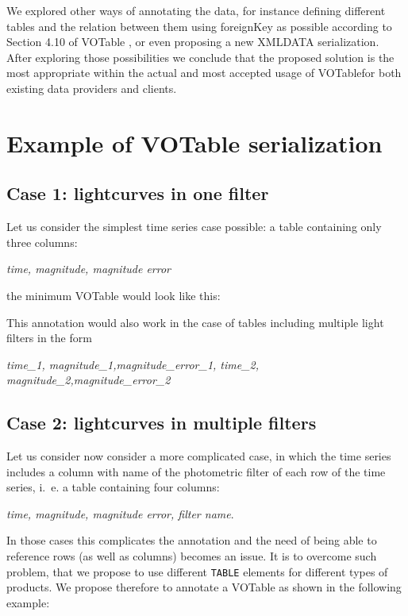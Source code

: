 \documentclass[11pt,a4paper]{ivoa}
\let\fg=\color
\def\elem#1{{\tt{\fg{DarkRed}#1}}}
\begin{document}


We explored other ways of annotating the data, for instance defining different tables and the relation between them using foreignKey as possible according to Section 4.10 of VOTable \citep{std:VOTABLE1.4}, or even proposing a new XMLDATA serialization. After exploring those possibilities we conclude that the proposed solution is the most appropriate within the actual and most accepted usage of VOTablefor both existing data providers and clients.

\section{Example of VOTable serialization}
\subsection{Case 1: lightcurves in one filter}
Let us consider the simplest time series case possible: a table containing only three columns:
\begin{center}
   \emph{time, magnitude, magnitude error}
\end{center}
the minimum VOTable would look like this:


This annotation would also work in the case of tables including multiple light filters in the form
\begin{center}
   \emph{time\_1, magnitude\_1,magnitude\_error\_1, time\_2, magnitude\_2,magnitude\_error\_2}
\end{center}

\subsection{Case 2: lightcurves in multiple filters}
Let us consider now consider a more complicated case, in which the time series includes a column with name of the photometric filter of each row of the time series, i.~e. a table containing four columns:
\begin{center}
   \emph{time, magnitude, magnitude error, filter name}.
\end{center}
In those cases this complicates the annotation and the need of being able to reference rows (as well as columns) becomes an issue. It is to overcome such problem, that we propose to use different \elem{TABLE} elements for different types of products. We propose therefore to annotate a VOTable as shown in the following example: 
\end{document}
